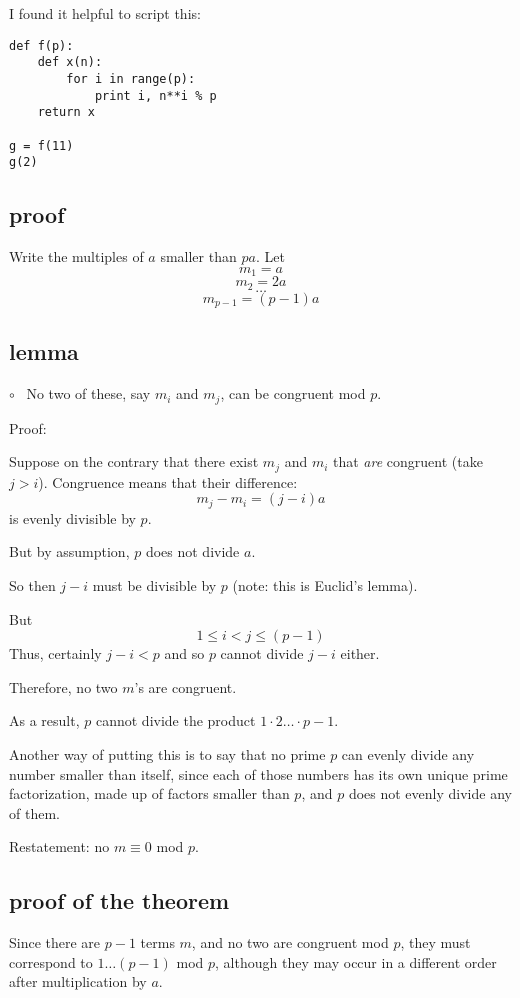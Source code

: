 \documentclass[11pt, oneside]{article}
\begin{document}
I found it helpful to script this:

\begin{verbatim}
def f(p):
    def x(n):
        for i in range(p):
            print i, n**i % p
    return x
    
g = f(11)
g(2) 
\end{verbatim}




\subsection*{proof}

Write the multiples of $a$ smaller than $pa$.  Let
\[ m_1 = a \]
\[ m_2 = 2a \]
\[ \dots \]
\[ m_{p-1} = (p-1)a  \]

\subsection*{lemma}

$\circ$ \ No two of these, say $m_i$ and $m_j$, can be congruent mod $p$.

Proof:

Suppose on the contrary that there exist $m_j$ and $m_i$ that \emph{are} congruent (take $j > i$).  Congruence means that their difference:
\[ m_j - m_i = (j - i)a \]
is evenly divisible by $p$.  

But by assumption, $p$ does not divide $a$.  

So then $j - i$ must be divisible by $p$ (note:  this is Euclid's lemma).  

But
\[ 1 \le i < j \le (p-1) \] 
Thus, certainly $j - i < p$ and so $p$ cannot divide $j-i$ either.

Therefore, no two $m$'s are congruent.

As a result, $p$ cannot divide the product $1 \cdot 2 \dots \cdot p-1$.

Another way of putting this is to say that no prime $p$ can evenly divide any number smaller than itself, since each of those numbers has its own unique prime factorization, made up of factors smaller than $p$, and $p$ does not evenly divide any of them.

Restatement:  no $m \equiv 0$ mod $p$.

\subsection*{proof of the theorem}

Since there are $p-1$ terms $m$, and no two are congruent mod $p$, they must correspond to $1 \dots (p-1)$ mod $p$, although they may occur in a different order after multiplication by $a$.
\end{document}
